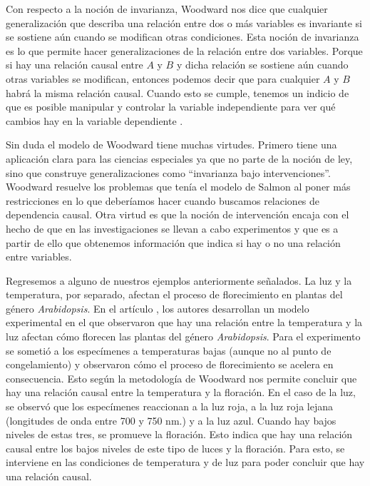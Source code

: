 Con respecto a la noción de invarianza, Woodward nos dice que cualquier generalización que describa una relación entre dos o más variables es invariante si se sostiene aún cuando se modifican otras condiciones. Esta noción de invarianza es lo que permite hacer generalizaciones de la relación entre dos variables. Porque si hay una relación causal entre $A$ y $B$ y dicha relación se sostiene aún cuando otras variables se modifican, entonces podemos decir que para cualquier $A$ y $B$ habrá la misma relación causal. Cuando esto se cumple, tenemos un indicio de que es posible manipular y controlar la variable independiente para ver qué cambios hay en la variable dependiente \cite{Woodward2000}.

Sin duda el modelo de Woodward tiene muchas virtudes. Primero tiene una aplicación clara para las ciencias especiales ya que no parte de la noción de ley, sino que construye generalizaciones como ``invarianza bajo intervenciones''. Woodward resuelve los problemas que tenía el modelo de Salmon al poner más restricciones en lo que deberíamos hacer cuando buscamos relaciones de dependencia causal. Otra virtud es que la noción de intervención encaja con el hecho de que en las investigaciones se llevan a cabo experimentos y que es a partir de ello que obtenemos información que indica si hay o no una relación entre variables.


















Regresemos a alguno de nuestros ejemplos anteriormente señalados. La luz y la temperatura, por separado,  afectan el proceso de florecimiento en plantas del género \emph{Arabidopsis}. En el artículo \cite{AusinEnviro}, los autores desarrollan un modelo experimental en el que observaron que hay una relación entre la temperatura y la luz afectan cómo florecen las plantas del género \emph{Arabidopsis}. Para el experimento se sometió a los especímenes a temperaturas bajas (aunque no al punto de congelamiento) y observaron cómo el proceso de florecimiento se acelera en consecuencia. Esto según la metodología de Woodward nos permite concluir que hay una relación causal entre la temperatura y la floración. En el caso de la luz, se observó que los especímenes reaccionan a la luz roja, a la luz roja lejana (longitudes de onda entre 700 y 750 nm.) y a la luz azul. Cuando hay bajos niveles de estas tres, se promueve la floración. Esto indica que hay una relación causal entre los bajos niveles de este tipo de luces y la floración. Para esto, se interviene en las condiciones de temperatura y de luz para poder concluir que hay una relación causal.

